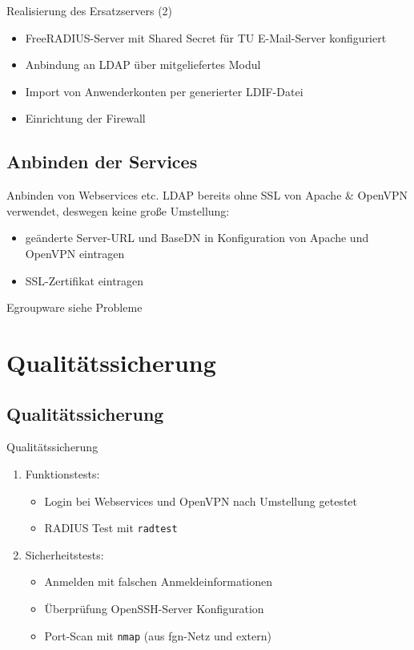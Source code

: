 \documentclass[presentation,svgnames,12pt]{beamer}
\begin{document}
\begin{frame}{Realisierung des Ersatzservers (2)}
\begin{itemize}
	\item FreeRADIUS-Server mit Shared Secret für TU E-Mail-Server konfiguriert
	\item Anbindung an LDAP über mitgeliefertes Modul%
	\item Import von Anwenderkonten per generierter LDIF-Datei
	\item Einrichtung der Firewall
\end{itemize}
\end{frame}


\subsection{Anbinden der Services}
\begin{frame}{Anbinden von Webservices etc.}
LDAP bereits ohne SSL von Apache \& OpenVPN verwendet, deswegen keine große Umstellung:
\vspace{6pt}
\begin{itemize}
	\item geänderte Server-URL und BaseDN in Konfiguration von Apache und OpenVPN eintragen
	\item SSL-Zertifikat eintragen
\end{itemize}
\medskip Egroupware siehe Probleme
\end{frame}


\section{Qualitätssicherung}
\subsection{Qualitätssicherung}
\begin{frame}{Qualitätssicherung}
\begin{enumerate}
	\item Funktionstests:
	\vspace{6pt}
	\begin{itemize}
		\item Login bei Webservices und OpenVPN nach Umstellung getestet
		\item RADIUS Test mit \texttt{radtest}%
	\end{itemize}
	\item Sicherheitstests:
	\vspace{6pt}
	\begin{itemize}
		\item Anmelden mit falschen Anmeldeinformationen%
		\item Überprüfung OpenSSH-Server Konfiguration
		\item Port-Scan mit \texttt{nmap} (aus fgn-Netz und extern)
	\end{itemize}
\end{enumerate}
\end{frame}
\end{document}
